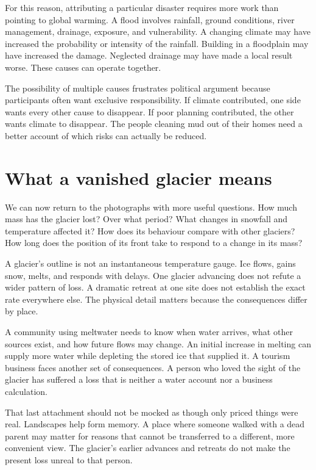 \documentclass[12pt,a4paper]{book}
\begin{document}
For this reason, attributing a particular disaster requires more work than pointing to global warming. A flood involves rainfall, ground conditions, river management, drainage, exposure, and vulnerability. A changing climate may have increased the probability or intensity of the rainfall. Building in a floodplain may have increased the damage. Neglected drainage may have made a local result worse. These causes can operate together.

The possibility of multiple causes frustrates political argument because participants often want exclusive responsibility. If climate contributed, one side wants every other cause to disappear. If poor planning contributed, the other wants climate to disappear. The people cleaning mud out of their homes need a better account of which risks can actually be reduced.

\section*{What a vanished glacier means}

We can now return to the photographs with more useful questions. How much mass has the glacier lost? Over what period? What changes in snowfall and temperature affected it? How does its behaviour compare with other glaciers? How long does the position of its front take to respond to a change in its mass?

A glacier's outline is not an instantaneous temperature gauge. Ice flows, gains snow, melts, and responds with delays. One glacier advancing does not refute a wider pattern of loss. A dramatic retreat at one site does not establish the exact rate everywhere else. The physical detail matters because the consequences differ by place.

A community using meltwater needs to know when water arrives, what other sources exist, and how future flows may change. An initial increase in melting can supply more water while depleting the stored ice that supplied it. A tourism business faces another set of consequences. A person who loved the sight of the glacier has suffered a loss that is neither a water account nor a business calculation.

That last attachment should not be mocked as though only priced things were real. Landscapes help form memory. A place where someone walked with a dead parent may matter for reasons that cannot be transferred to a different, more convenient view. The glacier's earlier advances and retreats do not make the present loss unreal to that person.
\end{document}
